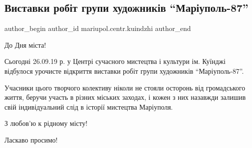  
 
 
 
 

\subsection{Виставки робіт групи художників \enquote{Маріуполь-87}}
\label{sec:26_09_2019.fb.mariupol.centr.kuindzhi.1.vystavka_87}

\ifcmt
 author_begin
   author_id mariupol.centr.kuindzhi
 author_end
\fi

До Дня міста!

Сьогодні 26.09.19 р. у Центрі сучасного мистецтва і культури ім. Куїнджі
відбулося урочисте відкриття виставки робіт групи художників \enquote{Маріуполь-87}.

Учасники цього творчого колективу ніколи не стояли осторонь від громадського
життя, беручи участь в різних міських заходах, і кожен з них назавжди залишив
свій індивідуальний слід в історії мистецтва Маріуполя.

З любов'ю к рідному місту!

Ласкаво просимо!
